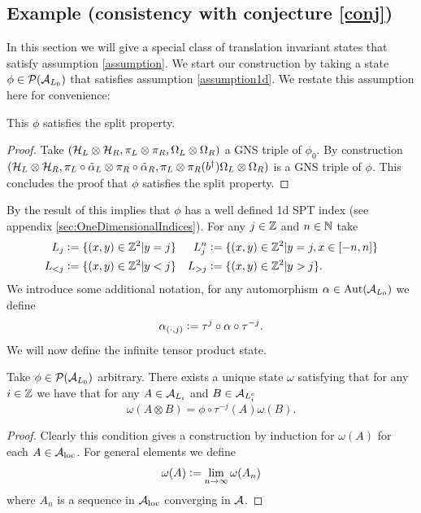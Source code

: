 \documentclass[12pt,a4paper,twoside]{article}
\numberwithin{equation}{section}
\begin{document}
\subsection{Example (consistency with conjecture \ref{conj})}\label{sec:OneTranslationDirectionExample}
In this section we will give a special class of translation invariant states that satisfy assumption \ref{assumption}. We start our construction by taking a state $\phi\in\PP(\AA_{L_0})$ that satisfies assumption \ref{assumption1d}. We restate this assumption here for convenience:
\assumptionOneDimensionalOne*
\begin{lemma}\label{lem:phiExampleConsistentWithConjectureSplitProperty}
	This $\phi$ satisfies the split property.
\end{lemma}
\begin{proof}
	Take $(\HH_L\otimes\HH_R,\pi_L\otimes\pi_R,\Omega_L\otimes\Omega_R)$ a GNS triple of $\phi_0$. By construction $(\HH_L\otimes\HH_R,\pi_L\circ\tilde\alpha_L\otimes\pi_R\circ\tilde\alpha_R,\pi_L\otimes\pi_R(b^\dagger)\Omega_L\otimes\Omega_R)$ is a GNS triple of $\phi$. This concludes the proof that $\phi$ satisfies the split property.
\end{proof}
By the result of \cite{ogata2019classification} this implies that $\phi$ has a well defined 1d SPT index (see appendix \ref{sec:OneDimensionalIndices}). For any $j\in\ZZ$ and $n\in\NN$ take
\begin{align}
	L_j&\defeq \{(x,y)\in\ZZ^2|y=j\}&L_{j}^{n}&\defeq \{(x,y)\in\ZZ^2|y=j,x\in[-n,n]\}\\
	L_{<j}&\defeq \{(x,y)\in\ZZ^2|y<j\}&L_{>j}&\defeq \{(x,y)\in\ZZ^2|y>j\}.
\end{align}
We introduce some additional notation, for any automorphism $\alpha\in\Aut{\AA_{L_0}}$ we define 
\begin{equation}
	\alpha_{(\cdot,j)}\defeq \tau^j\circ\alpha\circ\tau^{-j}.
\end{equation}
We will now define the infinite tensor product state.
\begin{definition}\label{def:InfiniteTensorProductState}
	Take $\phi\in\PP(\AA_{L_0})$ arbitrary. There exists a unique state $\omega$ satisfying that for any $i\in\ZZ$ we have that for any $A\in\AA_{L_i}$ and $B\in\AA_{L_i^c}$
	\begin{equation}
		\omega(A\otimes B)=\phi\circ\tau^{-j}(A)\omega(B).
	\end{equation}
\end{definition}
\begin{proof}
	Clearly this condition gives a construction by induction for $\omega(A)$ for each $A\in\AA_{\text{loc}}$. For general elements we define
	\begin{equation}
		\omega(A)\defeq \lim_{n\rightarrow\infty}\omega(A_n)
	\end{equation}
	where $A_n$ is a sequence in $\AA_{\text{loc}}$ converging in $\AA$.
\end{proof}
\end{document}
